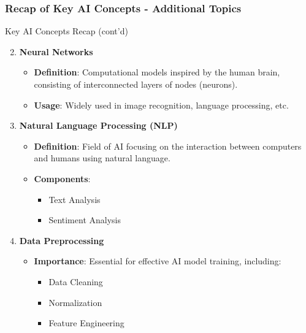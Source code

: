 \documentclass[aspectratio=169]{beamer}
\begin{document}
\begin{frame}[fragile]
    \frametitle{Recap of Key AI Concepts - Additional Topics}
    \begin{block}{Key AI Concepts Recap (cont'd)}
        \begin{enumerate}
            \setcounter{enumi}{1}
            \item \textbf{Neural Networks}
                \begin{itemize}
                    \item \textbf{Definition}: Computational models inspired by the human brain, consisting of interconnected layers of nodes (neurons).
                    \item \textbf{Usage}: Widely used in image recognition, language processing, etc.
                \end{itemize}
            \item \textbf{Natural Language Processing (NLP)}
                \begin{itemize}
                    \item \textbf{Definition}: Field of AI focusing on the interaction between computers and humans using natural language.
                    \item \textbf{Components}:
                        \begin{itemize}
                            \item Text Analysis
                            \item Sentiment Analysis
                        \end{itemize}
                \end{itemize}
            \item \textbf{Data Preprocessing}
                \begin{itemize}
                    \item \textbf{Importance}: Essential for effective AI model training, including:
                        \begin{itemize}
                            \item Data Cleaning
                            \item Normalization
                            \item Feature Engineering
                        \end{itemize}
                \end{itemize}
        \end{enumerate}
    \end{block}
\end{frame}
\end{document}
